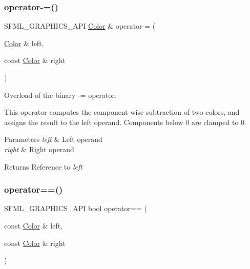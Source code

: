 \subsubsection{\texorpdfstring{operator-\/=()}{operator-=()}}
{\footnotesize\ttfamily S\+F\+M\+L\+\_\+\+G\+R\+A\+P\+H\+I\+C\+S\+\_\+\+A\+PI \hyperlink{classsf_1_1_color}{Color} \& operator-\/= (\begin{DoxyParamCaption}\item[{\hyperlink{classsf_1_1_color}{Color} \&}]{left,  }\item[{const \hyperlink{classsf_1_1_color}{Color} \&}]{right }\end{DoxyParamCaption})\hspace{0.3cm}{\ttfamily [related]}}



Overload of the binary -\/= operator. 

This operator computes the component-\/wise subtraction of two colors, and assigns the result to the left operand. Components below 0 are clamped to 0.


\begin{DoxyParams}{Parameters}
{\em left} & Left operand \\
\hline
{\em right} & Right operand\\
\hline
\end{DoxyParams}
\begin{DoxyReturn}{Returns}
Reference to {\itshape left} 
\end{DoxyReturn}
\mbox{\label{classsf_1_1_color_a7498d4670c7655e8d4d91ef49cc6064e}} 
\subsubsection{\texorpdfstring{operator==()}{operator==()}}
{\footnotesize\ttfamily S\+F\+M\+L\+\_\+\+G\+R\+A\+P\+H\+I\+C\+S\+\_\+\+A\+PI bool operator== (\begin{DoxyParamCaption}\item[{const \hyperlink{classsf_1_1_color}{Color} \&}]{left,  }\item[{const \hyperlink{classsf_1_1_color}{Color} \&}]{right }\end{DoxyParamCaption})\hspace{0.3cm}{\ttfamily [related]}}



